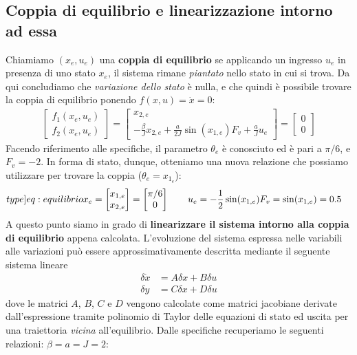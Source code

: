 \documentclass[a4paper, 11pt]{article}
\begin{document}
\subsection{Coppia di equilibrio e linearizzazione intorno ad essa}
Chiamiamo $(x_e, u_e)$ una \textbf{coppia di equilibrio} se applicando un ingresso $u_e$ in presenza di uno stato $x_e$, il sistema rimane \textit{piantato} nello stato in cui si trova. Da qui concludiamo che \textit{variazione dello stato} è nulla, e che quindi è possibile trovare la coppia di equilibrio ponendo $f(x, u) = \dot x = 0$:
\begin{align*}
	\begin{bmatrix}
		f_1(x_e, u_e) \\ f_2 (x_e, u_e)
	\end{bmatrix} = \begin{bmatrix}
		x_{2,e} \\ -\frac{\beta}{J} x_{2,e} + \frac{a}{2J} \sin(x_{1,e})F_v + \frac{a}{J} u_e
	\end{bmatrix} = \begin{bmatrix}
		0 \\ 0
	\end{bmatrix}
\end{align*}
Facendo riferimento alle specifiche, il parametro $\theta_e$ è conosciuto ed è pari a $\pi/6$, e $F_v = -2$. In forma di stato, dunque, otteniamo una nuova relazione che possiamo utilizzare per trovare la coppia ($\theta_e = x_{1_e}$):
\begin{align}\label[type]{eq:equilibrio}
	x_e = \begin{bmatrix}
		x_{1,e} \\ x_{2,e}
	\end{bmatrix} = \begin{bmatrix}
		\pi / 6 \\ 0
	\end{bmatrix} \quad \quad
   u_e & = - \frac{1}{2} \sin(x_{1,e})F_v = \sin(x_{1,e}) = 0.5
\end{align}
A questo punto siamo in grado di \textbf{linearizzare il sistema intorno alla coppia di equilibrio} appena calcolata.
%
L'evoluzione del sistema espressa nelle variabili alle variazioni pu\`o essere approssimativamente descritta mediante il seguente sistema lineare
%
\begin{align*}
	\delta \dot{x} &= A\delta x + B\delta u
	\\
	\delta y &= C\delta x + D\delta u
\end{align*}
%
dove le matrici $A$, $B$, $C$ e $D$ vengono calcolate come matrici jacobiane derivate dall'espressione tramite polinomio di Taylor delle equazioni di stato ed uscita per una traiettoria \textit{vicina} all'equilibrio. Dalle specifiche recuperiamo le seguenti relazioni: $\beta = a = J = 2$:
\end{document}
